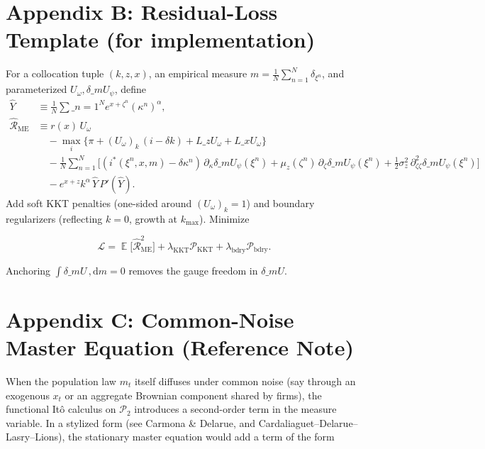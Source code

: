 \documentclass[11pt,letterpaper,oneside]{article}
\numberwithin{equation}{section}
\DeclareMathOperator{\E}{\mathbb{E}}
\newcommand{\1}{\mathbf{1}}
\newcommand{\diff}{,\mathrm{d}}
\newcommand{\Lz}{L\_z}
\newcommand{\Lx}{L\_x}
\newcommand{\dmU}{\delta\_m U}
\begin{document}
\section{Appendix B: Residual-Loss Template (for implementation)}\label{app:loss}

For a collocation tuple $(k,z,x)$, an empirical measure $m=\tfrac1N\sum_{n=1}^N \delta_{\xi^n}$, and parameterized $U_\omega,\dmU_\psi$, define
\begin{align*}
\widehat{Y} &\equiv \frac{1}{N}\sum\_{n=1}^N e^{x+\zeta^n}(\kappa^n)^\alpha,\\
\widehat{\mathcal{R}}_{\mathrm{ME}} &\equiv r(x)\,U_\omega\\
  &\quad - \max_{i}\Big\{ \pi + (U_{\omega})_k\,(i-\delta k) + \Lz U_{\omega} + \Lx U_{\omega} \Big\} \\
  &\quad - \frac{1}{N}\sum_{n=1}^N \Big[ (i^*(\xi^n,x,m)-\delta\kappa^n)\,\partial_{\kappa}\dmU_{\psi}(\xi^n)
    + \mu_z(\zeta^n)\,\partial_{\zeta}\dmU_{\psi}(\xi^n)
    + \tfrac12 \sigma_z^2\,\partial^2_{\zeta\zeta}\dmU_{\psi}(\xi^n) \Big] \\
  &\quad - e^{x+z}k^{\alpha}\,\widehat{Y}\,P'(\widehat{Y}).
  \end{align*}
  Add soft KKT penalties (one-sided around $(U_\omega)_k=1$) and boundary regularizers (reflecting $k=0$, growth at $k_{\max}$). Minimize

$$
\mathcal{L}=\E\big[\widehat{\mathcal{R}}_{\mathrm{ME}}^2\big]+\lambda_{\mathrm{KKT}}\mathcal{P}_{\mathrm{KKT}}
+\lambda_{\mathrm{bdry}}\mathcal{P}_{\mathrm{bdry}}.
$$

Anchoring $\int \dmU\,\diff m=0$ removes the gauge freedom in $\dmU$.

\section{Appendix C: Common-Noise Master Equation (Reference Note)}\label{app:common-noise}

When the population law $m_t$ itself diffuses under common noise (say through an exogenous $x_t$ or an aggregate Brownian component shared by firms), the functional Itô calculus on $\mathcal P_2$ introduces a second-order term in the measure variable. In a stylized form (see Carmona \& Delarue, and Cardaliaguet--Delarue--Lasry--Lions), the stationary master equation would add a term of the form
\end{document}
